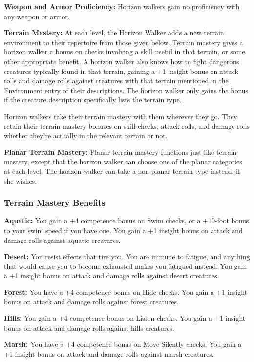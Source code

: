 {
\textbf{Weapon and Armor Proficiency:} Horizon walkers gain no proficiency with any weapon or armor.

\textbf{Terrain Mastery:} At each level, the Horizon Walker adds a new terrain environment to their repertoire from those given below. Terrain mastery gives a horizon walker a bonus on checks involving a skill useful in that terrain, or some other appropriate benefit. A horizon walker also knows how to fight dangerous creatures typically found in that terrain, gaining a +1 insight bonus on attack rolls and damage rolls against creatures with that terrain mentioned in the Environment entry of their descriptions. The horizon walker only gains the bonus if the creature description specifically lists the terrain type.

Horizon walkers take their terrain mastery with them wherever they go. They retain their terrain mastery bonuses on skill checks, attack rolls, and damage rolls whether they’re actually in the relevant terrain or not.

\textbf{Planar Terrain Mastery:} Planar terrain mastery functions just like terrain mastery, except that the horizon walker can choose one of the planar categories at each level. The horizon walker can take a non-planar terrain type instead, if she wishes.

\subsubsection{Terrain Mastery Benefits}
\textbf{Aquatic:} You gain a +4 competence bonus on Swim checks, or a +10-foot bonus to your swim speed if you have one. You gain a +1 insight bonus on attack and damage rolls against aquatic creatures.

\textbf{Desert:} You resist effects that tire you. You are immune to fatigue, and anything that would cause you to become exhausted makes you fatigued instead. You gain a +1 insight bonus on attack and damage rolls against desert creatures.

\textbf{Forest:} You have a +4 competence bonus on Hide checks. You gain a +1 insight bonus on attack and damage rolls against forest creatures.

\textbf{Hills:} You gain a +4 competence bonus on Listen checks. You gain a +1 insight bonus on attack and damage rolls against hills creatures.

\textbf{Marsh:} You have a +4 competence bonus on Move Silently checks. You gain a +1 insight bonus on attack and damage rolls against marsh creatures.

}
